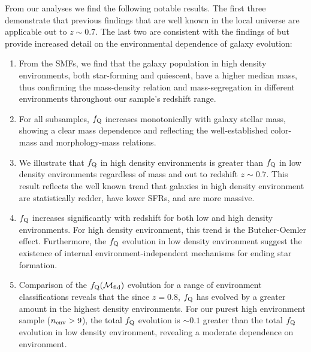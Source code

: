 \documentclass{emulateapj}
\begin{document}
From our analyses we find the following notable results. The first
three demonstrate that previous findings that are well known in the
local universe are applicable out to $z\sim 0.7$. The last two are
consistent with the findings of \cite{Peng:2010aa} but provide increased
detail on the environmental dependence of galaxy evolution:
\begin{enumerate}
	\item From the SMFs, we find that the galaxy population in high
    density environments, both star-forming and quiescent, have a
    higher median mass, thus confirming the mass-density relation and
    mass-segregation in different environments throughout our sample's
    redshift range.
	\item For all subsamples, $f_{\rm{Q}}$ increases monotonically with
    galaxy stellar mass, showing a clear mass dependence and
    reflecting the well-established color-mass and morphology-mass
    relations.
	\item We illustrate that $f_{\rm{Q}}$ in high density environments
    is greater than $f_{\rm{Q}}$ in low density environments
    regardless of mass and out to redshift $z\sim 0.7$. This result
    reflects the well known trend that galaxies in high density
    environment are statistically redder, have lower SFRs, and are
    more massive.
	\item $f_{\rm{Q}}$ increases significantly with redshift for both
    low and high density environments. For high density environment,
    this trend is the Butcher-Oemler effect. Furthermore, the
    $f_{\rm{Q}}$ evolution in low density environment suggest the
    existence of internal environment-independent mechanisms for
    ending star formation.
	\item Comparison of the $f_{\rm{Q}}(\mathcal{M}_{\rm{fid}})$
    evolution for a range of environment classifications reveals that
    the since $z = 0.8$, $f_{\rm{Q}}$ has evolved by a greater amount
    in the highest density environments. For our purest high
    environment sample ($n_{\rm{env}} > 9$), the total $f_{\rm{Q}}$
    evolution is $\sim 0.1$ greater than the total $f_{\rm{Q}}$
    evolution in low density environment, revealing a moderate
    dependence on environment.
\end{enumerate}
\end{document}
